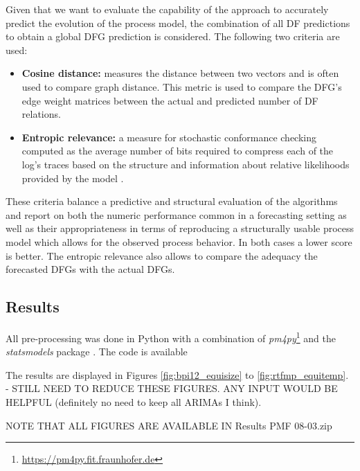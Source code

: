 Given that we want to evaluate the capability of the approach to accurately predict the evolution of the process model, the combination of all DF predictions to obtain a global DFG prediction is considered.
The following two criteria are used:
\begin{itemize}
	\item \textbf{Cosine distance:} measures the distance between two vectors and is often used to compare graph distance. This metric is used to compare the DFG's edge weight matrices between the actual and predicted number of DF relations.
	\item \textbf{Entropic relevance:} a measure for stochastic conformance checking computed as the average number of bits required to compress each of the log’s traces based on the structure and information about relative likelihoods provided by the model \cite{DBLP:conf/icpm/PolyvyanyyMG20}.
\end{itemize}
These criteria balance a predictive and structural evaluation of the algorithms and report on both the numeric performance common in a forecasting setting as well as their appropriateness in terms of reproducing a structurally usable process model which allows for the observed process behavior.
In both cases a lower score is better.
The entropic relevance also allows to compare the adequacy the forecasted DFGs with the actual DFGs.

\subsection{Results}
All pre-processing was done in Python with a combination of \emph{pm4py}\footnote{\url{https://pm4py.fit.fraunhofer.de}} and the \emph{statsmodels} package \cite{seabold2010statsmodels}. 
The code is available %

The results are displayed in Figures \ref{fig:bpi12_equisize} to \ref{fig:rtfmp_equitemp}. - STILL NEED TO REDUCE THESE FIGURES. ANY INPUT WOULD BE HELPFUL (definitely no need to keep all ARIMAs I think). 

NOTE THAT ALL FIGURES ARE AVAILABLE IN Results PMF 08-03.zip

